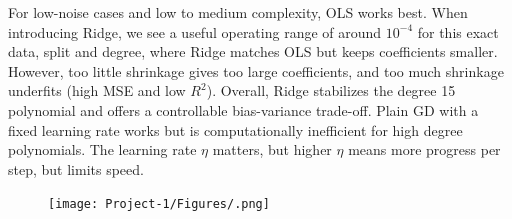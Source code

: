 \documentclass[amssymb,twocolumn,aps]{revtex4-2}
\begin{document}
For low-noise cases and low to medium complexity, OLS works best. When introducing Ridge, we see a useful operating range of around $10^{-4}$ for this exact data, split and degree, where Ridge matches OLS but keeps coefficients smaller. However, too little shrinkage gives too large coefficients, and too much shrinkage underfits (high MSE and low $R^2$). Overall, Ridge stabilizes the degree 15 polynomial and offers a controllable bias-variance trade-off. Plain GD with a fixed learning rate works but is computationally inefficient for high degree polynomials. The learning rate $\eta$ matters, but higher $\eta$ means more progress per step, but limits speed. 

\begin{figure}[H]
    \centering
    \texttt{[image: Project-1/Figures/.png]}
    \caption{}
    \label{fig:}
\end{figure}


\end{document}
